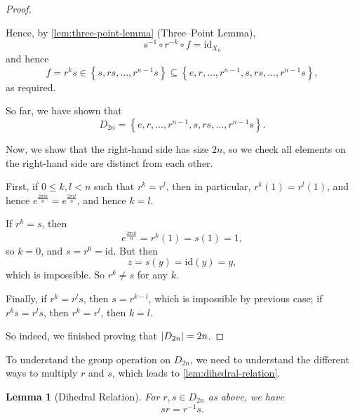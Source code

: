 \documentclass{article}
\newtheorem{lemma}[theorem]{Lemma}
\theoremstyle{definition}
\theoremstyle{remark}
\DeclarePairedDelimiter{\abs}{\lvert}{\rvert}
\newcommand{\pqty}[1]{\left(#1\right)}
\newcommand{\Bqty}[1]{\left\{#1\right\}}
\newcommand{\inverse}{^{-1}}
\newcommand{\identity}{\mathrm{id}}
\begin{document}
\begin{proof}
\begin{enumerate}
        Hence, by \autoref{lem:three-point-lemma} (Three--Point Lemma),
        \[
            s\inverse \circ r^{-k} \circ f = \identity_{X_n}
        \]
        and hence
        \[
            f = r^k s \in \Bqty{s, rs, \ldots, r^{n - 1}s} \subseteq \Bqty{e, r, \ldots, r^{n - 1}, s, rs, \ldots, r^{n - 1}s},
        \]
        as required.
    \end{enumerate}

    So far, we have shown that
    \[
        D_{2n} = \Bqty{e, r, \ldots, r^{n - 1}, s, rs, \ldots, r^{n - 1}s}.
    \]

    Now, we show that the right-hand side has size \(2n\), so we check all elements on the right-hand side are distinct from each other.

    First, if \(0 \leq k, l < n\) such that \(r^k = r^l\), then in particular, \(r^k \pqty{1} = r^l \pqty{1}\), and hence \(e^{\frac{2 \pi i k}{n}} = e^{\frac{2 \pi i l}{n}}\), and hence \(k = l\).

    If \(r^{k} = s\), then
    \[
        e^{\frac{2 \pi i k}{n}} = r^{k} \pqty{1} = s \pqty{1} = 1,
    \]
    so \(k = 0\), and \(s = r^{0} = \identity\). But then
    \[
        z = s\pqty{y} = \identity\pqty{y} = y,
    \]
    which is impossible. So \(r^{k} \neq s\) for any \(k\).

    Finally, if \(r^{k} = r^{l} s\), then \(s = r^{k - l}\), which is impossible by previous case; if \(r^{k} s = r^{l} s\), then \(r^{k} = r^{l}\), then \(k = l\).

    So indeed, we finished proving that \(\abs{D_{2n}} = 2n\).
\end{proof}

To understand the group operation on \(D_{2n}\), we need to understand the different ways to multiply \(r\) and \(s\), which leads to \autoref{lem:dihedral-relation}.

\begin{lemma}[Dihedral Relation]
    \label{lem:dihedral-relation}%
    For \(r, s \in D_{2n}\) as above, we have
    \[
        s r = r^{-1} s.
    \]
\end{lemma}
\end{document}
